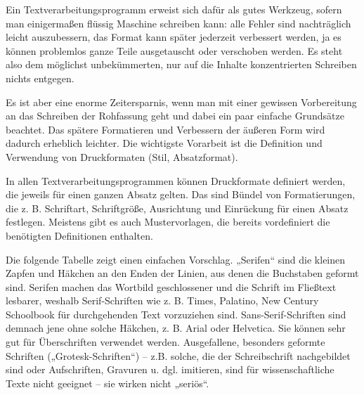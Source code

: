 \documentclass[]{book}
\theoremstyle{definition}
\theoremstyle{definition}
\theoremstyle{definition}
\theoremstyle{remark}
\begin{document}
Ein Textverarbeitungsprogramm erweist sich dafür als gutes Werkzeug,
sofern man einigermaßen flüssig Maschine schreiben kann: alle Fehler
sind nachträglich leicht auszubessern, das Format kann später jederzeit
verbessert werden, ja es können problemlos ganze Teile ausgetauscht oder
verschoben werden. Es steht also dem möglichst unbekümmerten, nur auf
die Inhalte konzentrierten Schreiben nichts entgegen.

Es ist aber eine enorme Zeitersparnis, wenn man mit einer gewissen
Vorbereitung an das Schreiben der Rohfassung geht und dabei ein paar
einfache Grundsätze beachtet. Das spätere Formatieren und Verbessern der
äußeren Form wird dadurch erheblich leichter. Die wichtigste Vorarbeit
ist die Definition und Verwendung von Druckformaten (Stil,
Absatzformat).

In allen Textverarbeitungsprogrammen können Druckformate definiert
werden, die jeweils für einen ganzen Absatz gelten. Das sind Bündel von
Formatierungen, die z. B. Schriftart, Schriftgröße, Ausrichtung und
Einrückung für einen Absatz festlegen. Meistens gibt es auch
Mustervorlagen, die bereits vordefiniert die benötigten Definitionen
enthalten.

Die folgende Tabelle zeigt einen einfachen Vorschlag. „Serifen`` sind
die kleinen Zapfen und Häkchen an den Enden der Linien, aus denen die
Buchstaben geformt sind. Serifen machen das Wortbild geschlossener und
die Schrift im Fließtext lesbarer, weshalb Serif-Schriften wie z. B.
Times, Palatino, New Century Schoolbook für durchgehenden Text
vorzuziehen sind. Sans-Serif-Schriften sind demnach jene ohne solche
Häkchen, z. B. Arial oder Helvetica. Sie können sehr gut für
Überschriften verwendet werden. Ausgefallene, besonders geformte
Schriften („Grotesk-Schriften``) -- z.B. solche, die der Schreibschrift
nachgebildet sind oder Aufschriften, Gravuren u. dgl. imitieren, sind
für wissenschaftliche Texte nicht geeignet -- sie wirken nicht
„seriös``.
\end{document}
